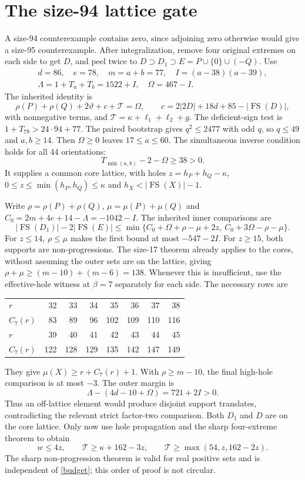 \documentclass[11pt,a4paper]{article}
\newcommand{\FS}{\operatorname{FS}}
\newcommand{\T}{\mathcal T}
\begin{document}
\section{The size-94 lattice gate}
A size-94 counterexample contains zero, since adjoining zero otherwise
would give a size-95 counterexample. After integralization, remove four
original extremes on each side to get $D$, and peel twice to
$D\supset D_1\supset E=P\cup\{0\}\cup(-Q)$. Use
\begin{gather*}
 d=86,\quad e=78,\quad m=a+b=77,\quad I=(a-38)(a-39),\\
 \Lambda=1+T_a+T_b=1522+I,\quad\Omega=467-I.
\end{gather*}
The inherited identity is
\[
 \rho(P)+\rho(Q)+2\vartheta+c+\T=\Omega,
 \qquad c=2|2D|+18d+85-|\FS(D)|,
\]
with nonnegative terms, and $\T=\kappa+\ell_1+\ell_2+g$.
The deficient-sign test is $1+T_{78}>24\cdot94+77$.
The paired bootstrap gives $q^2\le2477$ with odd $q$, so $q\le49$
and $a,b\ge14$. Then $\Omega\ge0$ leaves $17\le a\le60$.
The simultaneous inverse condition holds for all 44 orientations:
\[
 T_{\min(a,b)}-2-\Omega\ge38>0.
\]
It supplies a common core lattice, with holes
$z=h_P+h_Q-\kappa$, $0\le z\le\min(h_P,h_Q)\le\kappa$ and
$h_X<|\FS(X)|-1$.

Write $\rho=\rho(P)+\rho(Q)$, $\mu=\mu(P)+\mu(Q)$ and
$C_0=2m+4e+14-\Lambda=-1042-I$. The inherited inner comparisons are
\[
 |\FS(D_1)|-2|\FS(E)|\le
 \min\{C_0+\Omega+\rho-\mu+2z,\ C_0+3\Omega-\rho-\mu\}.
\]
For $z\le14$, $\rho\le\mu$ makes the first bound at most $-547-2I$.
For $z\ge15$, both supports are non-progressions. The size-17 theorem
already applies to the cores, without assuming the outer sets are on
the lattice, giving $\rho+\mu\ge(m-10)+(m-6)=138$.
Whenever this is insufficient, use the effective-hole witness at
$\beta=7$ separately for each side. The necessary rows are
\begin{center}\small
\begin{tabular}{lrrrrrrr}\toprule
$r$&32&33&34&35&36&37&38\\
$C_7(r)$&83&89&96&102&109&110&116\\\midrule
$r$&39&40&41&42&43&44&45\\
$C_7(r)$&122&128&129&135&142&147&149\\\bottomrule
\end{tabular}
\end{center}
They give $\mu(X)\ge r+C_7(r)+1$. With $\rho\ge m-10$, the final
high-hole comparison is at most $-3$. The outer margin is
\[
 \Lambda-(4d-10+\Omega)=721+2I>0.
\]
Thus an off-lattice element would produce disjoint support translates,
contradicting the relevant strict factor-two comparison. Both $D_1$ and
$D$ are on the core lattice. Only now use hole propagation and the sharp
four-extreme theorem to obtain
\begin{equation}\label{budget}
 w\le4z,\qquad\T\ge\kappa+162-3z,\qquad
 \T\ge\max(54,z,162-2z).
\end{equation}
The sharp non-progression theorem is valid for real positive sets and
is independent of \eqref{budget}; this order of proof is not circular.
\end{document}
